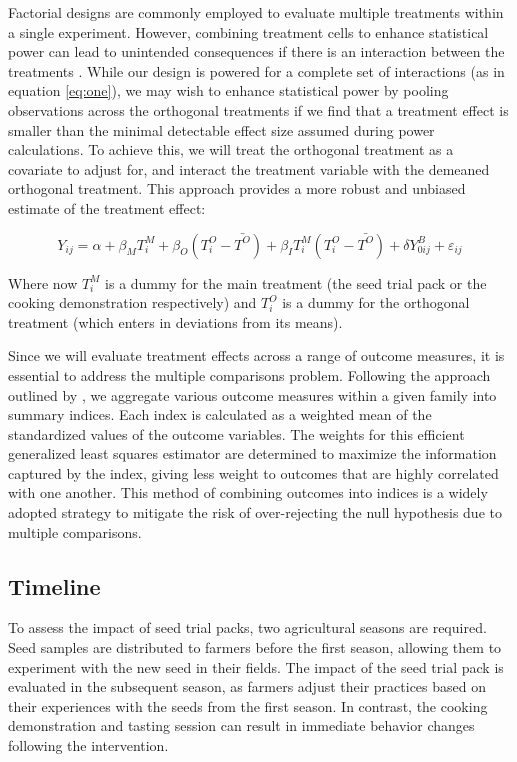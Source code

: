\documentclass[english]{article}\usepackage[]{graphicx}\usepackage[]{xcolor}
\begin{document}
Factorial designs are commonly employed to evaluate multiple treatments
within a single experiment. However, combining treatment cells to
enhance statistical power can lead to unintended consequences if there
is an interaction between the treatments \citep{10.1162/rest_a_01317}.
While our design is powered for a complete set of interactions (as
in equation \ref{eq:one}), we may wish to enhance statistical power
by pooling observations across the orthogonal treatments if we find
that a treatment effect is smaller than the minimal detectable effect
size assumed during power calculations. To achieve this, we will treat
the orthogonal treatment as a covariate to adjust for, and interact
the treatment variable with the demeaned orthogonal treatment. This
approach provides a more robust and unbiased estimate of the treatment
effect:

\begin{equation}
Y_{ij}=\alpha+\beta_{M}T_{i}^{M}+\beta_{O}\left(T_{i}^{O}-\bar{T^{O}}\right)+\beta_{I}T_{i}^{M}\left(T_{i}^{O}-\bar{T^{O}}\right)+\delta Y_{0ij}^{B}+\varepsilon_{ij}\label{eq:pooled}
\end{equation}

Where now $T_{i}^{M}$ is a dummy for the main treatment (the seed
trial pack or the cooking demonstration respectively) and $T_{i}^{O}$
is a dummy for the orthogonal treatment (which enters in deviations
from its means).

Since we will evaluate treatment effects across a range of outcome
measures, it is essential to address the multiple comparisons problem.
Following the approach outlined by \citet{doi:10.1198/016214508000000841},
we aggregate various outcome measures within a given family into summary
indices. Each index is calculated as a weighted mean of the standardized
values of the outcome variables. The weights for this efficient generalized
least squares estimator are determined to maximize the information
captured by the index, giving less weight to outcomes that are highly
correlated with one another. This method of combining outcomes into
indices is a widely adopted strategy to mitigate the risk of over-rejecting
the null hypothesis due to multiple comparisons.

\subsection{Timeline}

To assess the impact of seed trial packs, two agricultural seasons
are required. Seed samples are distributed to farmers before the first
season, allowing them to experiment with the new seed in their fields.
The impact of the seed trial pack is evaluated in the subsequent season,
as farmers adjust their practices based on their experiences with
the seeds from the first season. In contrast, the cooking demonstration
and tasting session can result in immediate behavior changes following
the intervention.
\end{document}
